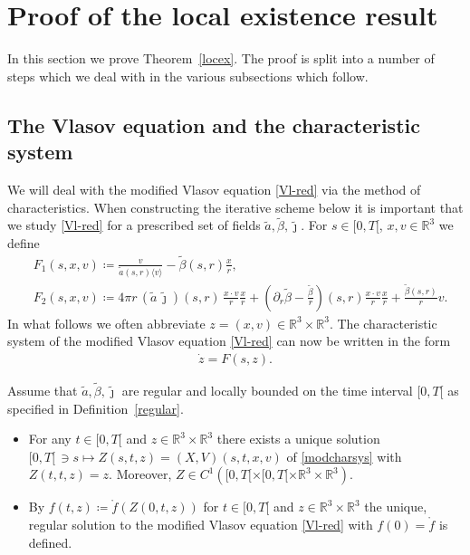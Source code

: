\documentclass[11pt]{article}
\def\R{\mathbb R}
\def\p0{\langle v \rangle}
\begin{document}
\section{Proof of the local existence result}
\label{section_locex_proof}
\setcounter{equation}{0}
%
%
In this section we prove Theorem~\ref{locex}.
The proof is split into a number of steps
which we deal with in the various subsections which follow.
%
%
\subsection{The Vlasov equation and the characteristic system}
%
%
We will deal with the modified Vlasov equation \eqref{Vl-red} via the method of
characteristics. When constructing the iterative scheme below it is important
that we study \eqref{Vl-red} for a prescribed set of fields
$\tilde a,\tilde \beta, \tilde\jmath$.
For $s\in [0,T[$, $x,v\in \R^3$ we define
\begin{align}
  &
  F_1(s,x,v)\coloneqq
  \frac{v}{\tilde a(s,r) \p0}-\tilde\beta(s,r)\frac{x}{r}, \label{F1-def}\\
  &
  F_2(s,x,v)\coloneqq
  4\pi r \,(\tilde a\, \tilde\jmath)(s,r)\, \frac{x\cdot v}{r} \frac{x}{r}
  +\left(\partial_r\tilde \beta
  -\frac{\tilde \beta}{r}\right)(s,r)\frac{x\cdot v}{r} \frac{x}{r}
    +\frac{\tilde \beta(s,r)}{r} v. \label{F2-def}
\end{align}
In what follows we often abbreviate $z=(x,v)\in \R^3\times\R^3$.
The characteristic system of the modified Vlasov equation \eqref{Vl-red}
can now be written in the form
\begin{align}\label{modcharsys}
  \dot z = F(s,z).
\end{align}
%
\begin{lemma} \label{modcharsyssolve}
  Assume that $\tilde a,\tilde \beta, \tilde\jmath$
  are regular and locally bounded
  on the time interval $[0,T[$ as specified
  in Definition~\ref{regular}.
  \begin{itemize}
  \item[(a)]
    For any $t\in [0,T[$ and $z\in \R^3\times\R^3$ there exists a unique
    solution $[0,T[\,\ni s \mapsto Z(s,t,z)=(X,V)(s,t,x,v)$ of
    \eqref{modcharsys} with
    $Z(t,t,z)=z$. Moreover,
    $Z\in C^1 ([0,T[\times [0,T[\times\R^3\times\R^3)$.
  \item[(b)]
    By $f(t,z)\coloneqq\mathring{f}(Z(0,t,z))$ for $t\in [0,T[$ and
    $z\in \R^3\times\R^3$
    the unique, regular solution to the modified Vlasov equation \eqref{Vl-red}
    with $f(0)=\mathring{f}$ is defined.
  \end{itemize}
\end{lemma}
\end{document}
